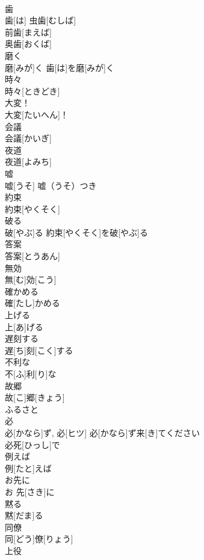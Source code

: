 \documentclass[8pt]{extreport}
\begin{document}
\begin{CJK}{UTF8}{min}
\\	歯	
\\	歯[は]	虫歯[むしば] 
\\	前歯[まえば] 
\\	奥歯[おくば] 
\\	磨く	
\\	磨[みが]く	歯[は]を磨[みが]く 
\\	時々	
\\	時々[ときどき]	
\\	大変！	
\\	大変[たいへん]！	
\\	会議	
\\	会議[かいぎ]	
\\	夜道	
\\	夜道[よみち]	
\\	嘘	
\\	嘘[うそ]	嘘（うそ）つき 
\\	約束	
\\	約束[やくそく]	
\\	破る	
\\	破[やぶ]る	約束[やくそく]を破[やぶ]る 
\\	答案	
\\	答案[とうあん]	
\\	無効	
\\	無[む]効[こう]	
\\	確かめる	
\\	確[たし]かめる	
\\	上げる	
\\	上[あ]げる	
\\	遅刻する	
\\	遅[ち]刻[こく]する	
\\	不利な	
\\	不[ふ]利[り]な	
\\	故郷	
\\	故[こ]郷[きょう]	
\\	ふるさと
\\	必	
\\	必[かなら]ず, 必[ヒツ]	必[かなら]ず来[き]てください 
\\	必死[ひっし]で 
\\	例えば	
\\	例[たと]えば	
\\	お先に	
\\	お 先[さき]に	
\\	黙る	
\\	黙[だま]る	
\\	同僚	
\\	同[どう]僚[りょう]	
\\	上役	

\end{CJK}
\end{document}
